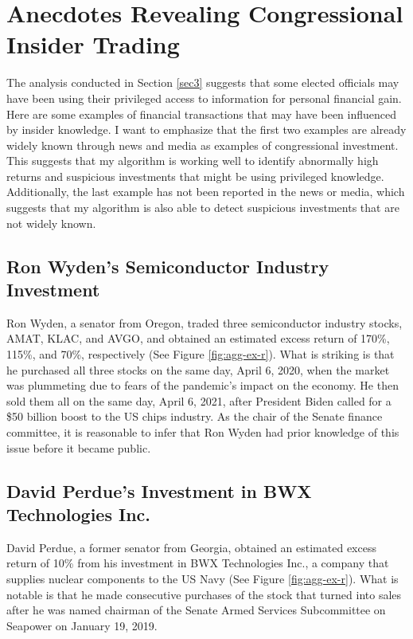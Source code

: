 \documentclass[12pt,letterpaper]{article}
\begin{document}

\section{Anecdotes Revealing Congressional Insider Trading}

The analysis conducted 
in Section \ref{sec3} suggests that some elected officials may have been using their privileged access to information for personal financial gain. Here are some examples of financial transactions that may have been influenced by insider knowledge. I want to emphasize that the first two examples are already widely known through news and media as examples of congressional investment. This suggests that my algorithm is working well to identify abnormally high returns and suspicious investments that might be using privileged knowledge. Additionally, the last example has not been reported in the news or media, which suggests that my algorithm is also able to detect suspicious investments that are not widely known.

\subsection{Ron Wyden's Semiconductor Industry Investment}

Ron Wyden, a senator from Oregon, traded three semiconductor industry stocks, AMAT, KLAC, and AVGO, and obtained an estimated excess return of 170\%, 115\%, and 70\%, respectively (See Figure \ref{fig:agg-ex-r}). What is striking is that he purchased all three stocks on the same day, April 6, 2020, when the market was plummeting due to fears of the pandemic's impact on the economy. He then sold them all on the same day, April 6, 2021, after President Biden called for a \$50 billion boost to the US chips industry. As the chair of the Senate finance committee, it is reasonable to infer that Ron Wyden had prior knowledge of this issue before it became public.

\subsection{David Perdue's Investment in BWX Technologies Inc.}

David Perdue, a former senator from Georgia, obtained an estimated excess return of 10\% from his investment in BWX Technologies Inc., a company that supplies nuclear components to the US Navy (See Figure \ref{fig:agg-ex-r}). What is notable is that he made consecutive purchases of the stock that turned into sales after he was named chairman of the Senate Armed Services Subcommittee on Seapower on January 19, 2019.
\end{document}

